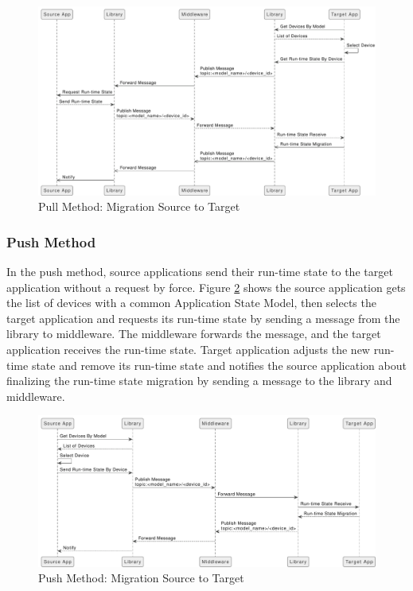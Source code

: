 \FloatBarrier \begin{figure}[H]
    \includegraphics[width=\linewidth]{../figures/Pull-Method.pdf}
    \centering
    \caption{Pull Method: Migration Source to Target}
    \label{fig:Pull-Method}
\end{figure} \FloatBarrier

\subsubsection{Push Method}
In the push method, source applications send their run-time state to the target application without a request by force. Figure \ref{fig:Push-Method} shows the source application gets the list of devices with a common Application State Model, then selects the target application and requests its run-time state by sending a message from the library to middleware. The middleware forwards the message, and the target application receives the run-time state. Target application adjusts the new run-time state and remove its run-time state and notifies the source application about finalizing the run-time state migration by sending a message to the library and middleware. 

\FloatBarrier \begin{figure}[H]
    \includegraphics[width=\linewidth]{../figures/Push-Method.pdf}
    \centering
    \caption{Push Method: Migration Source to Target}
    \label{fig:Push-Method}
\end{figure} \FloatBarrier


